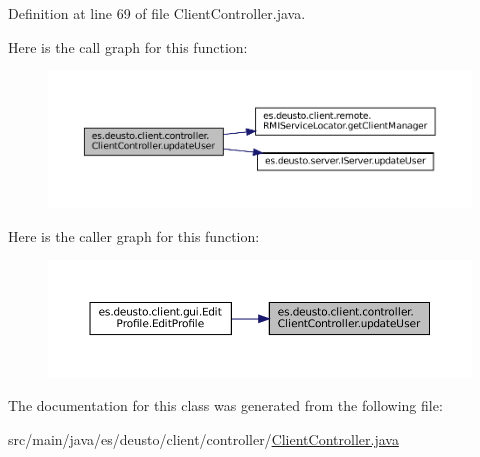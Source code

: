 Definition at line 69 of file Client\+Controller.\+java.

Here is the call graph for this function\+:
\nopagebreak
\begin{figure}[H]
\begin{center}
\leavevmode
\includegraphics[width=350pt]{classes_1_1deusto_1_1client_1_1controller_1_1_client_controller_ad1a2384c7c7f73d40d8d50c4bf77be7d_cgraph}
\end{center}
\end{figure}
Here is the caller graph for this function\+:
\nopagebreak
\begin{figure}[H]
\begin{center}
\leavevmode
\includegraphics[width=350pt]{classes_1_1deusto_1_1client_1_1controller_1_1_client_controller_ad1a2384c7c7f73d40d8d50c4bf77be7d_icgraph}
\end{center}
\end{figure}


The documentation for this class was generated from the following file\+:\begin{DoxyCompactItemize}
\item 
src/main/java/es/deusto/client/controller/\mbox{\hyperlink{_client_controller_8java}{Client\+Controller.\+java}}\end{DoxyCompactItemize}
